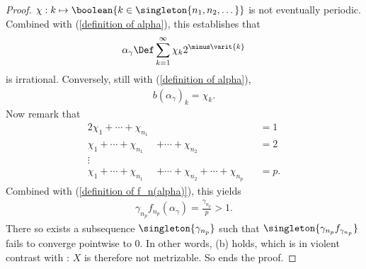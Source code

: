\begin{proof}
  $\chi: k\mapsto \boolean{k \in \singleton{n_1, n_2, \dots}}$ %
is not eventually periodic. %
Combined with (\ref{definition of alpha}), this establishes that 
%
\def\xgamma{\alpha_{\gamma}}
%
  \begin{align}
    \xgamma 
      \Def
    \sum_{k=1}^\infty \chi_k 2^{\minus \varit{k}}
  \end{align}
%
is irrational. Conversely, still with (\ref{definition of alpha}),  %
%
  \begin{align}
    b(\xgamma)_{k} = \chi_{k}.
  \end{align}
%
Now remark that %
%
  \begin{alignat}{2}
    \chi_1 + \cdots + \chi_{n_{1}} & &&=1 \\
    \chi_1 + \cdots + \chi_{n_{1}} & + \cdots + \chi_{n_{2}} &&=2 \\
    \nonumber \vdots&  &&\\
    \chi_1 + \cdots + \chi_{n_{1}} & + \cdots + \chi_{n_{2}} + \cdots + 
    \chi_{n_{p}}&&=p.
  \end{alignat}
%
Combined with (\ref{definition of f_n(alpha)}), this yields %
%
  \begin{align}
    \gamma_{n_p} f_{n_{p}}(\xgamma) = \frac{\gamma_{n_p}}{p} > 1.
  \end{align}
%
There so exists a subsequence $\singleton{\gamma_{n_p}}$ such that %
%
  $\singleton{\gamma_{n_p} f_{\gamma_{n_p}}}$ %
%
fails to converge pointwise to $0$. %
In other words, (b) holds, which is in violent contrast with %
: $X$ is therefore not metrizable. So ends the proof.
\end{proof}
